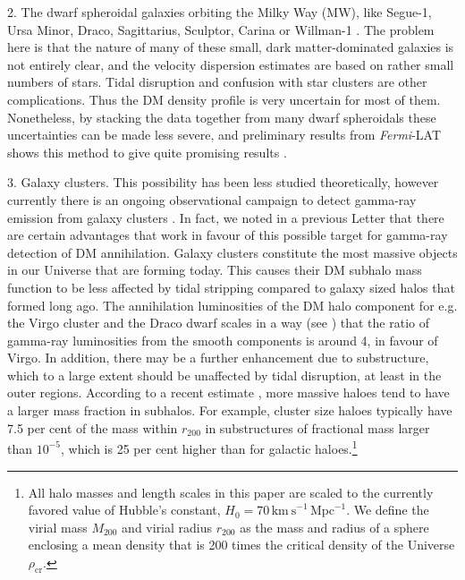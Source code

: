 \documentclass[10pt,aps,pra,reprint,amsmath,amsfonts,amssymb,showpacs,nofootinbib,floatfix]{revtex4-1}
\newcommand{\Fermi}{{\em Fermi}\xspace}
\newcommand{\rmn}{\mathrm}
\newcommand{\rvir}{r_{200}}
\newcommand{\mvir}{M_{200}}
\begin{document}
2. The dwarf spheroidal galaxies orbiting the Milky Way (MW), like
Segue-1, Ursa Minor, Draco, Sagittarius, Sculptor, Carina or Willman-1
\cite{2009JCAP...01..016B,2010ApJ...720.1174A,2010JCAP...01..031S,2010JCAP...01..031S,2011arXiv1103.0477T,2011APh....34..608H}. The
problem here is that the nature of many of these small, dark
matter-dominated galaxies is not entirely clear, and the velocity
dispersion estimates are based on rather small numbers of stars. Tidal
disruption and confusion with star clusters are other
complications. Thus the DM density profile is very uncertain for most
of them. Nonetheless, by stacking the data together from many dwarf
spheroidals these uncertainties can be made less severe, and
preliminary results from \Fermi-LAT shows this method to give quite
promising results \cite{garde}.

3. Galaxy clusters. This possibility has been less studied
theoretically, however currently there is an ongoing observational
campaign to detect gamma-ray emission from galaxy clusters
\cite{2010ApJ...710..634A,2010JCAP...05..025A,2009A&A...495...27A,2009IJMPD..18.1627D,2009A&A...502..437A,2009arXiv0907.5000G,2009ApJ...704..240K,2009ApJ...706L.275A,2010ApJ...717L..71A}. In
fact, we noted in a previous Letter \cite{2009PhRvL.103r1302P} that
there are certain advantages that work in favour of this possible
target for gamma-ray detection of DM annihilation. Galaxy clusters
constitute the most massive objects in our Universe that are forming
today. This causes their DM subhalo mass function to be less affected
by tidal stripping compared to galaxy sized halos that formed long
ago. The annihilation luminosities of the DM halo component for
e.g. the Virgo cluster and the Draco dwarf scales in a way (see
\cite{2009PhRvL.103r1302P}) that the ratio of gamma-ray luminosities
from the smooth components is around 4, in favour of Virgo. In
addition, there may be a further enhancement due to substructure,
which to a large extent should be unaffected by tidal disruption, at
least in the outer regions. According to a recent estimate
\cite{2011MNRAS.410.2309G}, more massive haloes tend to have a larger
mass fraction in subhalos. For example, cluster size haloes typically
have 7.5 per cent of the mass within $r_{200}$ in substructures of
fractional mass larger than $10^{-5}$, which is 25 per cent higher
than for galactic haloes.\footnote{All halo masses and length scales
  in this paper are scaled to the currently favored value of Hubble's
  constant, $H_0 = 70\, \rmn{km~s}^{-1}\,\rmn{Mpc}^{-1}$. We define
  the virial mass $\mvir$ and virial radius $\rvir$ as the mass and
  radius of a sphere enclosing a mean density that is 200 times the
  critical density of the Universe $\rho_{\rmn{cr}}$.}
\end{document}
